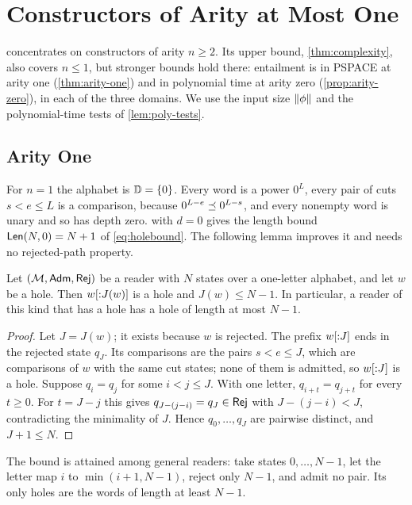 \section{Constructors of Arity at Most One}
\label{app:small-arity}

 concentrates on constructors of arity $n\ge2$. Its
upper bound, \cref{thm:complexity}, also covers $n\le1$, but stronger bounds
hold there: entailment is in PSPACE at arity one (\cref{thm:arity-one}) and in
polynomial time at arity zero (\cref{prop:arity-zero}), in each of the three
domains. We use the input size $\|\phi\|$ and the polynomial-time tests of
\cref{lem:poly-tests}.

\subsection{Arity One}

For $n=1$ the alphabet is $\mathbb{D}=\{0\}$. Every word is a power $0^L$, every
pair of cuts $s<e\le L$ is a comparison, because $0^{L-e}\preceq0^{L-s}$, and
every nonempty word is unary and so has depth zero.  with
$d=0$ gives the length bound $\mathsf{Len}(N,0)=N+1$ of \eqref{eq:holebound}.
The following lemma improves it and needs no rejected-path property.

\begin{lemma}\label{lem:one-letter}
Let $(\mathcal M,\mathsf{Adm},\mathsf{Rej})$ be a reader with $N$ states over a one-letter
alphabet, and let $w$ be a hole. Then $w[{:}J(w)]$ is a hole and
$J(w)\le N-1$. In particular, a reader of this kind that has a hole has a
hole of length at most $N-1$.
\end{lemma}

\begin{proof}
Let $J=J(w)$; it exists because $w$ is rejected. The prefix $w[{:}J]$
ends in the rejected state $q_J$. Its comparisons are the pairs $s<e\le J$,
which are comparisons of $w$ with the same cut states; none of them is
admitted, so $w[{:}J]$ is a hole. Suppose $q_i=q_j$ for some $i<j\le J$.
With one letter, $q_{i+t}=q_{j+t}$ for every $t\ge0$. For $t=J-j$ this gives
$q_{J-(j-i)}=q_J\in\mathsf{Rej}$ with $J-(j-i)<J$, contradicting the minimality of
$J$. Hence $q_0,\ldots,q_J$ are pairwise distinct, and $J+1\le N$.
\end{proof}

The bound is attained among general readers: take states $0,\ldots,N-1$,
let the letter map $i$ to $\min(i+1,N-1)$, reject only $N-1$, and admit no
pair. Its only holes are the words of length at least $N-1$.


